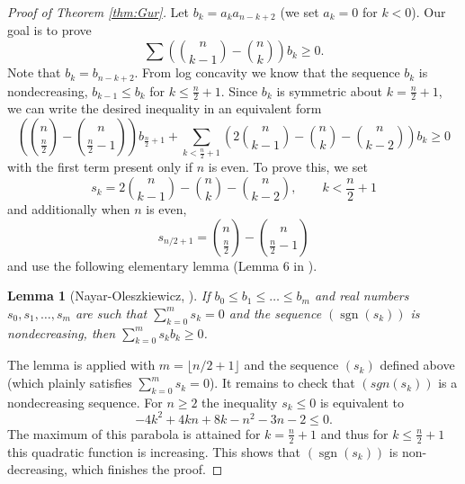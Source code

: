 \documentclass[10pt]{article}
\newcommand{\1}{\textbf{1}}
\DeclareMathOperator{\sgn}{sgn}
\newtheorem{lemma}[theorem]{Lemma}
\theoremstyle{remark}
\theoremstyle{definition}
\begin{document}
\begin{proof}[Proof of Theorem \ref{thm:Gur}]
Let $b_k = a_k a_{n-k+2}$ (we set $a_k=0$ for $k<0$). Our goal is to prove
\[
	\sum \left({n \choose k-1} - {n \choose k} \right) b_k \geq 0.
\]
Note that $b_k = b_{n-k+2}$. From log concavity we know that the sequence $b_k$ is nondecreasing, $b_{k-1} \leq b_{k}$ for $k \leq \frac{n}{2}+1$.
Since $b_k$ is symmetric about $k=\frac{n}{2}+1$, we can write the desired inequality in an equivalent form
\[
	\left({n \choose \frac{n}{2}} - {n \choose \frac{n}{2}-1} \right) b_{\frac{n}{2}+1} +  \sum_{k < \frac{n}{2}+1} \left(2 {n \choose k-1} - {n \choose k} - {n \choose k-2 } \right) b_k \geq 0
\]
with the first term present only if $n$ is even. To prove this, we set
\[
s_k = 2 {n \choose k-1} - {n \choose k} - {n \choose k-2 }, \qquad k < \frac{n}{2}+1
\]
and additionally when $n$ is even,
\[
s_{n/2+1} = {n \choose \frac{n}{2}} - {n \choose \frac{n}{2}-1}
\]
and use the following elementary lemma (Lemma 6 in \cite{NO}). 
\begin{lemma}[Nayar-Oleszkiewicz, \cite{NO}]\label{lm:NO}
If $b_0 \leq b_1 \leq \ldots \leq b_m$ and real numbers $s_0, s_1, \ldots, s_m$ are such that $\sum_{k=0}^m s_k = 0$ and the sequence $(\sgn(s_k))$ is nondecreasing, then $\sum_{k=0}^m s_k b_k \geq 0$.
\end{lemma}

The lemma is applied with $m = \lfloor n/2+1 \rfloor$ and the sequence $(s_k)$ defined above (which plainly satisfies $\sum_{k=0}^m s_k = 0$). It remains to check that $(sgn(s_k))$ is a nondecreasing sequence. 
For $n \geq 2$ the inequality $s_k \leq 0$ is equivalent to
\[
	-4k^2 +4kn +8k - n^2 - 3n-2 \leq 0.
\] 
The maximum of this parabola is attained for $k=\frac{n}{2}+1$ and thus for $k \leq \frac{n}{2}+1$ this quadratic function is increasing. This shows that $(\sgn(s_k))$ is non-decreasing, which finishes the proof.
\end{proof}
\end{document}
